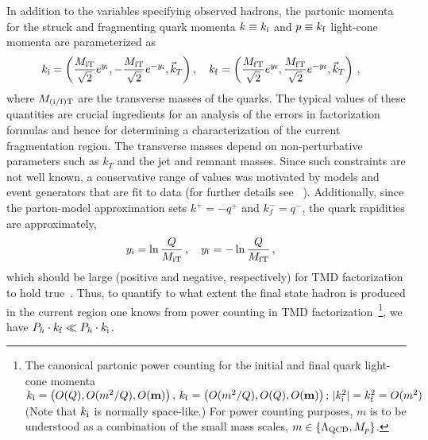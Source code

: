 \documentclass[final,3p,times,onecolumn,sort&compress,hidelinks]{elsarticle}
\newcommand{\Tsc}[2]{#1_{#2\text{T}}}
\newcommand{\initq}{\ensuremath{k_{\rm i}}}
\newcommand{\finalq}{\ensuremath{k_{\rm f}}}
\newcommand{\inity}{\ensuremath{y_{\rm i}}}
\newcommand{\finaly}{\ensuremath{y_{\rm f}}}
\newcommand{\parz}[1]{\ensuremath{\left(#1\right)}}
\begin{document}
In addition to the variables specifying observed hadrons, the partonic momenta
for the struck and fragmenting quark 
momenta  $k\equiv\initq$ and $p\equiv\finalq$
 light-cone  momenta are parameterized as
\begin{align}
\initq &{}=\parz{\frac{\Tsc{M}{\rm i}}{\sqrt{2}} e^{\inity},-\frac{\Tsc{M}{\rm i}}{\sqrt{2}} e^{-\inity},\vec{k}_T}, \quad
\finalq {}= \parz{\frac{\Tsc{M}{\rm f}}{\sqrt{2}} e^{\finaly}, \frac{\Tsc{M}{\rm f}}{\sqrt{2}} e^{-\finaly},\vec{k}_T} \, ,
\label{eq:yquarkb}
\end{align}
where $\Tsc{M}{\rm (i/f)}$ are the transverse masses of the quarks.
The typical values of these quantities are crucial ingredients for an
analysis of the errors in factorization formulas and hence for
determining a characterization of the current fragmentation region.
The transverse masses depend on non-perturbative parameters such as
$k_T$ and the jet and remnant masses. Since such constraints are not well known,
a conservative range of values was motivated by models and event generators that are fit to data (for further details see ~\cite{Boglione:2016bph}). Additionally, since the parton-model approximation sets $k^+=-q^+$ and $k_f^-=q^-$, the quark rapidities are approximately,
\begin{align}
\inity {}&= \ln \frac{Q}{\Tsc{M}{\rm i} } \, ,  \quad
\finaly {}= - \ln \frac{Q}{\Tsc{M}{\rm f} }  \, , \label{eq:in outquark}
\end{align}
which should be large (positive and negative, respectively) for TMD
factorization to hold true~\cite{Collins:2011zzd,Boglione:2016bph}.
Thus, to quantify to what extent the final state hadron  is
produced in the current region one knows from power counting in TMD factorization~\footnote{The canonical partonic power counting for the initial and final quark light-cone momenta $\initq = \parz{O(Q),O(m^2/Q), O({\bf m})} , \,
  \finalq  = \parz{O(m^2/Q),O(Q), O({\bf m}) };\, 
|\initq^2| =\finalq^2 = O(m^2)$  (Note that $\initq$ is normally space-like.)
For power counting purposes, $m$ is to be understood as a combination
of the small mass scales, $m \in \{\Lambda_{\rm QCD}, M_p \}$.},
we have $P_h \cdot \finalq \ll P_h \cdot\initq$. 
\end{document}
